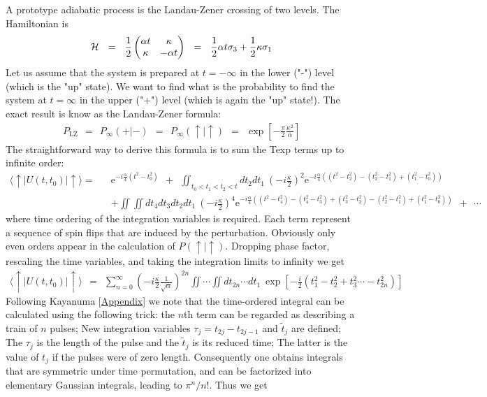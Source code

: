 \documentclass[onecolumn,fleqn]{revtex4}
\newcommand{\eexp}{\mathrm{e}^}
\newcommand{\tbox}[1]{\text{#1}}
\newcommand{\amatrix}[1]{\begin{matrix} #1 \end{matrix}}
\newcommand{\beq}{\begin{eqnarray}}
\newcommand{\eeq}{\end{eqnarray}}
\begin{document}
A prototype adiabatic process is the 
Landau-Zener crossing of two levels. 
The Hamiltonian is 
\beq
\mathcal{H}
\ \ = \ \ 
\frac{1}{2}\left(\amatrix{\alpha t & \kappa \cr \kappa & -\alpha t}\right)
\ \ = \ \ 
\frac{1}{2}\alpha t \sigma_3 + \frac{1}{2}\kappa \sigma_1 
\eeq
Let us assume that the system is prepared at ${t=-\infty}$
in the lower ("-") level (which is the "up" state). 
We want to find what is the probability to find 
the system at ${t=\infty}$ in the upper ("+") level 
(which is again the "up" state!). The exact result is 
know as the Landau-Zener formula:
\beq 
P_{\tbox{LZ}} \ \ = \ \ P_{\infty}(+|-)  \ \ = \ \ P_{\infty}(\uparrow|\uparrow)
\ \ = \ \ \exp\left[-\frac{\pi}{2}\frac{\kappa^2}{\alpha} \right]
\eeq
The straightforward way to derive this formula is to 
sum the Texp terms up to infinite order:
\beq \nonumber
\langle \uparrow | U(t,t_0) | \uparrow \rangle = \!\! &&  
\eexp{-i\frac{\alpha}{4} (t^2-t_0^2)} 
\ \ + \ \ \iint_{t_0<t_1<t_2<t} dt_2dt_1 \ \left(-i\frac{\kappa}{2}\right)^2 \eexp{-i\frac{\alpha}{4} \left((t^2-t_2^2)-(t_2^2-t_1^2)+(t_1^2-t_0^2)\right)}
\\ && +\iint\iint dt_4 dt_3 dt_2 dt_1 \ 
\left(-i\frac{\kappa}{2}\right)^4 \eexp{-i\frac{\alpha}{4}\left( (t^2-t_4^2)-(t_4^2-t_3^2)+(t_3^2-t_2^2)-(t_2^2-t_1^2)+(t_1^2-t_0^2)\right)}
\ \ + \ \ \cdots
\eeq 
where time ordering of the integration variables is required. 
Each term represent a sequence of spin flips that are induced by the perturbation. 
Obviously only even orders appear in the calculation of $P(\uparrow|\uparrow)$. 
Dropping phase factor, rescaling the time variables, and taking 
the integration limits to infinity we get   
\beq 
\langle \uparrow | U(t,t_0) | \uparrow \rangle \ \ = \ \ 
\sum_{n=0}^{\infty}  \left(-i\frac{\kappa}{2}\frac{1}{\sqrt{\alpha}}\right)^{2n} \iint \cdots \iint dt_{2n} \cdots dt_1 \ 
\exp\left[-\frac{i}{2}\left(t_1^2-t_2^2+t_3^2 \cdots -t_{2n}^2 \right)\right]
\eeq
Following Kayanuma [\href{http://journals.jps.jp/doi/abs/10.1143/JPSJ.53.108}{Appendix}]  
we note that the time-ordered integral can be calculated using the 
following trick: the $n$th term can be regarded as describing a train 
of $n$ pulses; New integration variables $\tau_j=t_{2j}-t_{2j-1}$ and $\tilde{t}_j$ are defined;   
The $\tau_j$ is the length of the pulse and the $\tilde{t}_j$  is its reduced time; 
The latter is the value of $t_j$ if the pulses were of zero length.
Consequently one obtains integrals that are symmetric under time permutation, 
and can be factorized into elementary Gaussian integrals, leading to $\pi^n/n!$. 
Thus we get  
\end{document}
